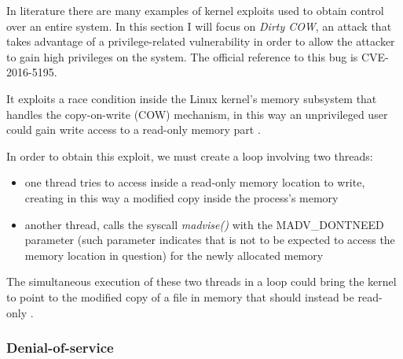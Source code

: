 \documentclass[a4paper,12pt]{article}
\begin{document}
In literature there are many examples of kernel exploits used to obtain control
over an entire system. In this section I will focus on \textit{Dirty COW}, an
attack that takes advantage of a privilege-related vulnerability in order to
allow the attacker to gain high privileges on the system. The official reference
to this bug is CVE-2016-5195.\par It exploits a race condition inside the Linux
kernel's memory subsystem that handles the copy-on-write (COW) mechanism, in
this way an unprivileged user could gain write access to a read-only memory
part \cite{red_hat_dirtycow}.\par In order to obtain this exploit, we must create
a loop involving two threads:
\begin{itemize}
  \item one thread tries to access inside a read-only memory location to
  write, creating in this way a modified copy inside the process's memory
  \item another thread, calls the syscall
  \textit{madvise()} \cite{madvise_description} with the MADV\_DONTNEED parameter
  (such parameter indicates that is not to be expected to access the memory
  location in question) for the newly allocated memory
  \end{itemize}
The simultaneous execution of these two threads in a loop could bring the
kernel to point to the modified copy of a file in memory that should instead be
read-only \cite{dirtycow_how_it_worrks}.

\subsubsection{Denial-of-service}
\end{document}
